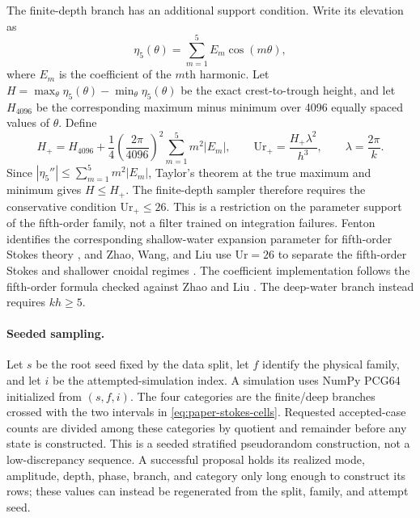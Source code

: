 The finite-depth branch has an additional support condition.  Write its
elevation as
\begin{equation}
  \eta_5(\theta)=\sum_{m=1}^{5}E_m\cos(m\theta),
  \label{eq:paper-stokes-harmonics}
\end{equation}
where $E_m$ is the coefficient of the $m$th harmonic.  Let
$H=\max_\theta\eta_5(\theta)-\min_\theta\eta_5(\theta)$ be the exact
crest-to-trough height, and let $H_{4096}$ be the corresponding maximum minus
minimum over 4096 equally spaced values of $\theta$.  Define
\begin{equation}
  H_+
  =
  H_{4096}
  +\frac{1}{4}\left(\frac{2\pi}{4096}\right)^2
    \sum_{m=1}^{5}m^2|E_m|,
  \qquad
  \mathrm{Ur}_+
  =
  \frac{H_+\lambda^2}{h^3},
  \qquad
  \lambda=\frac{2\pi}{k}.
  \label{eq:paper-stokes-ursell}
\end{equation}
Since $|\eta_5''|\leq\sum_{m=1}^5m^2|E_m|$, Taylor's theorem at the true
maximum and minimum gives $H\leq H_+$.  The finite-depth sampler therefore
requires the conservative condition $\mathrm{Ur}_+\leq26$.  This is a
restriction on the parameter support of the fifth-order family, not a filter
trained on integration failures.  Fenton identifies the corresponding
shallow-water expansion parameter for fifth-order Stokes theory
\cite{fenton1985}, and Zhao, Wang, and Liu use $\mathrm{Ur}=26$ to separate
the fifth-order Stokes and shallower cnoidal regimes \cite{zhao2024}.
The coefficient implementation follows the fifth-order formula checked
against Zhao and Liu \cite{zhao2022}.  The deep-water branch instead requires
$kh\geq5$.

\paragraph{Seeded sampling.}
Let $s$ be the root seed fixed by the data split, let $f$ identify the physical
family, and let $i$ be the attempted-simulation index.  A simulation uses NumPy
PCG64 initialized from $(s,f,i)$.  The four
categories are the finite/deep branches crossed with the two intervals in
\cref{eq:paper-stokes-cells}.  Requested accepted-case counts are divided
among these categories by quotient and remainder before any state is constructed.
This is a seeded stratified pseudorandom construction, not a low-discrepancy
sequence.  A successful proposal holds its realized mode, amplitude, depth,
phase, branch, and category only long enough to construct its rows; these
values can instead be regenerated from the split, family, and attempt seed.

